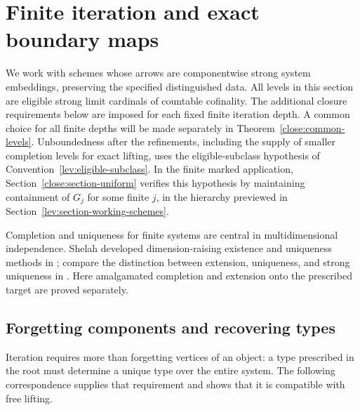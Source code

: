 \section{Finite iteration and exact boundary maps}
\label{iter:section-boundaries}

We work with schemes whose arrows are componentwise strong system
embeddings, preserving the specified distinguished data. All levels in
this section are eligible strong limit cardinals of countable cofinality.
The additional closure requirements below are imposed for each fixed
finite iteration depth. A common choice for all finite depths will be
made separately in Theorem~\ref{close:common-levels}.
Unboundedness after the refinements, including the supply of smaller
completion levels for exact lifting, uses the eligible-subclass
hypothesis of Convention~\ref{lev:eligible-subclass}.  In the finite
marked application, Section~\ref{close:section-uniform} verifies this
hypothesis by maintaining containment of $G_j$ for some finite $j$, in
the hierarchy previewed in Section~\ref{lev:section-working-schemes}.

Completion and uniqueness for finite systems are central in
multidimensional independence.  Shelah developed dimension-raising
existence and uniqueness methods in \cite[Sections~3--5]{Shelah1983B};
compare the distinction between extension, uniqueness, and strong
uniqueness in \cite[Definition~8.16]{ShelahVasey2024}. Here amalgamated completion
and extension onto the prescribed target are proved separately.

\subsection{Forgetting components and recovering types}

Iteration requires more than forgetting vertices of an object: a type
prescribed in the root must determine a unique type over the entire
system.  The following correspondence supplies that requirement and
shows that it is compatible with free lifting.

